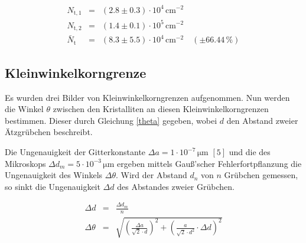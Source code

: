 \documentclass[12pt,a4paper]{scrartcl}
\numberwithin{equation}{section} %
\begin{document}
\begin{eqnarray}
    N_\mathrm{t,1} &=& (2.8 \pm 0.3) \cdot 10^4 \mathrm{\, cm^{-2}} \\
    N_\mathrm{t,2} &=& (1.4 \pm 0.1) \cdot 10^5 \mathrm{\, cm^{-2}}
    \\
    \bar N_\mathrm{t}
        &=& (8.3 \pm 5.5) \cdot 10^4 \mathrm{\, cm^{-2}}
        \quad(\pm 66.44\,\%)
\end{eqnarray}

\hypertarget{kleinwinkelkorngrenze}{%
\subsection{Kleinwinkelkorngrenze}\label{kleinwinkelkorngrenze}}

Es wurden drei Bilder von Kleinwinkelkorngrenzen aufgenommen. Nun werden die Winkel $\theta$ zwischen den Kristalliten an diesen Kleinwinkelkorngrenzen bestimmen. Dieser durch Gleichung \eqref{theta} gegeben, wobei $d$ den Abstand zweier Ätzgrübchen beschreibt.

Die Ungenauigkeit der Gitterkonstante $\Delta a=1 \cdot 10^{-7} \mathrm{\, \mu m}$ $[5]$ und die des Mikroskops $\Delta d_m = 5 \cdot 10^{-3} \mathrm{\, \mu m}$ ergeben mittels Gauß'scher Fehlerfortpflanzung die Ungenauigkeit des Winkels $\Delta \theta$. Wird der Abstand $d_n$ von $n$ Grübchen gemessen, so sinkt die Ungenauigkeit $\Delta d$ des Abstandes zweier Grübchen.

\begin{eqnarray}
    \Delta d &=& \frac{\Delta d_m}{n} \\
    \Delta \theta &=& \sqrt{
        \left(\frac{\Delta a}{\sqrt{2} \cdot d} \right)^2
            + \left( \frac{a}{\sqrt{2} \cdot d^2} \cdot \Delta d \right)^2 }
            \label{DeltaTheta}
\end{eqnarray}
\end{document}
